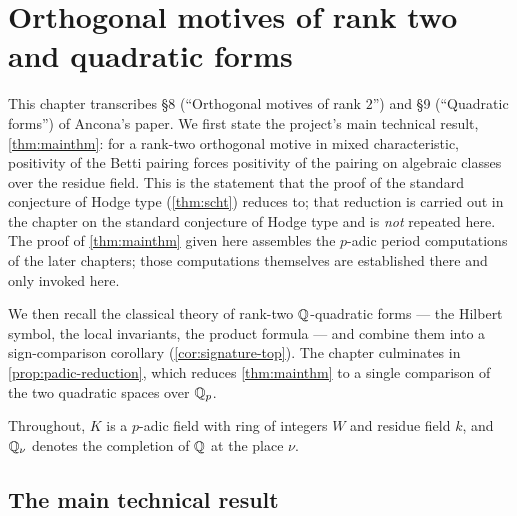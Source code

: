 \chapter{Orthogonal motives of rank two and quadratic forms}

This chapter transcribes \S8 (``Orthogonal motives of rank $2$'') and \S9
(``Quadratic forms'') of Ancona's paper. We first state the project's main
technical result, \cref{thm:mainthm}: for a rank-two orthogonal motive in mixed
characteristic, positivity of the Betti pairing forces positivity of the
pairing on algebraic classes over the residue field. This is the statement that
the proof of the standard conjecture of Hodge type (\cref{thm:scht}) reduces to;
that reduction is carried out in the chapter on the standard conjecture of Hodge
type and is \emph{not} repeated here. The proof of \cref{thm:mainthm} given here
assembles the \(p\)-adic period computations of the later chapters; those
computations themselves are established there and only invoked here.

We then recall the classical theory of rank-two \(\mathbb{Q}\)-quadratic forms --- the
Hilbert symbol, the local invariants, the product formula --- and combine them
into a sign-comparison corollary (\cref{cor:signature-top}). The chapter
culminates in \cref{prop:padic-reduction}, which reduces \cref{thm:mainthm} to a
single comparison of the two quadratic spaces over \(\mathbb{Q}_p\).

Throughout, \(K\) is a \(p\)-adic field with ring of integers \(W\) and residue
field \(k\), and \(\mathbb{Q}_\nu\) denotes the completion of \(\mathbb{Q}\) at the place
\(\nu\).

\section*{The main technical result}

